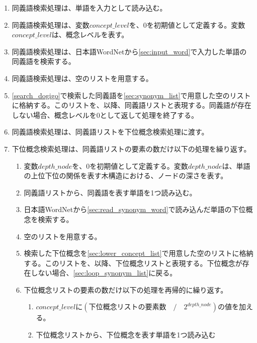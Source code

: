 \begin{enumerate}
    \item 同義語検索処理は、単語を入力として読み込む。
    \label{sec:input_word}
    \item 同義語検索処理は、変数$concept\_level$を、0を初期値として定義する。変数$concept\_level$は、概念レベルを表す。
    \item 同義語検索処理は、日本語WordNetから\ref{sec:input_word}で入力した単語の同義語を検索する。
    \label{search_dogigo}
    \item 同義語検索処理は、空のリストを用意する。
    \label{sec:synonym_list}
    \item \ref{search_dogigo}で検索した同義語を\ref{sec:synonym_list}で用意した空のリストに格納する。このリストを、以降、同義語リストと表現する。同義語が存在しない場合、概念レベルを0として返して処理を終了する。
    \item 同義語検索処理は、同義語リストを下位概念検索処理に渡す。
    \item 下位概念検索処理は、同義語リストの要素の数だけ以下の処理を繰り返す。
        \begin{enumerate}
            \item 変数$depth\_node$を、0を初期値として定義する。変数$depth\_node$は、単語の上位下位の関係を表す木構造における、ノードの深さを表す。
            \label{sec:loop_synonym_list}
            \item 同義語リストから、同義語を表す単語を1つ読み込む。
            \label{sec:read_synonym_word}
            \item 日本語WordNetから\ref{sec:read_synonym_word}で読み込んだ単語の下位概念を検索する。
            \item 空のリストを用意する。
            \label{sec:lower_concept_list}
            \item 検索した下位概念を\ref{sec:lower_concept_list}で用意した空のリストに格納する。このリストを、以降、下位概念リストと表現する。下位概念が存在しない場合、\ref{sec:loop_synonym_list}に戻る。
            \item 下位概念リストの要素の数だけ以下の処理を再帰的に繰り返す。
                \begin{enumerate}
                    \item $concept\_level$に$(下位概念リストの要素数\quad/\quad2^{depth\_node})$の値を加える。
                    \label{sec:loop_lower_list}
                    \item 下位概念リストから、下位概念を表す単語を1つ読み込む
                    \label{sec:read_lower_word}

\end{enumerate}
\end{enumerate}
\end{enumerate}
